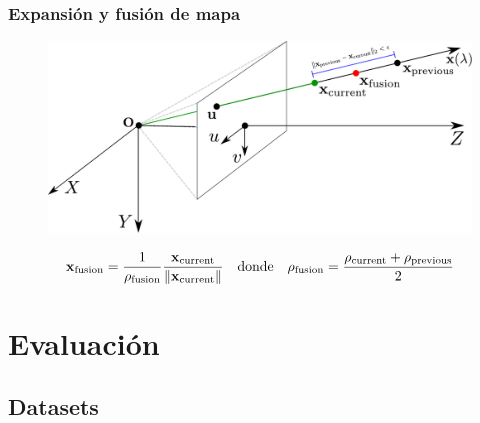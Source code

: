\documentclass[compress]{beamer}
\begin{document}
\begin{frame}
	\frametitle{Expansión y fusión de mapa}
	\begin{figure}[htb]
		\centering
		\includegraphics[width=\columnwidth]{images/map_fusion.pdf}
	\end{figure}
	
	\begin{equation*}
		\boldsymbol{\mathbf{x}}_{\mathrm{\mathrm{fusion}}} = \dfrac{1}{\rho_\mathrm{\mathrm{fusion}}} \dfrac{\boldsymbol{\mathbf{x}}_{\mathrm{\mathrm{current}}}}{\left\lVert\boldsymbol{\mathbf{x}}_{\mathrm{\mathrm{current}}}\right\rVert}
		\quad \text{donde} \quad 
		\rho_{\mathrm{fusion}} = \dfrac{\rho_{\mathrm{current}} + \rho_{\mathrm{previous}}}{2}
	\end{equation*}
\end{frame}


\section{Evaluación}


\subsection{Datasets}
\end{document}
